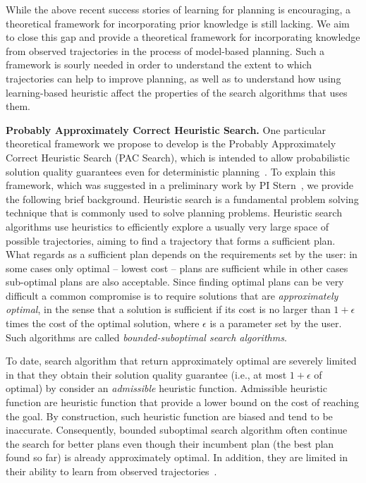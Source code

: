 \documentclass[12pt]{article}
\begin{document}
While the above recent success stories of learning for planning is encouraging, a theoretical framework for incorporating prior knowledge is still lacking. 
We aim to close this gap and provide a theoretical framework for incorporating knowledge from observed trajectories in the process of model-based planning. Such a framework is sourly needed in order to understand the extent to which trajectories can help to improve planning, as well as to understand how using learning-based heuristic affect the properties of the search algorithms that uses them. 


{\bf Probably Approximately Correct Heuristic Search.} 
One particular theoretical framework we propose to develop is the Probably Approximately Correct Heuristic Search (PAC Search), which is intended to allow probabilistic solution quality guarantees even for deterministic planning~\cite{stern2011probably,stern2012search}. 
To explain this framework, which was suggested in a preliminary work by PI Stern~\cite{stern2011probably,stern2012search}, we provide the following brief background. 
Heuristic search is a fundamental problem solving technique that is commonly used to solve planning problems. Heuristic search algorithms use heuristics to efficiently explore a usually very large space of possible trajectories, aiming to find a trajectory that forms a sufficient plan. What regards as a sufficient plan depends on the requirements set by the user: in some cases only optimal -- lowest cost -- plans are sufficient while in other cases sub-optimal plans are also acceptable. Since finding optimal plans can be very difficult a common compromise is to require solutions that are {\em approximately optimal}, in the sense that a solution is sufficient if its cost is no larger than $1+\epsilon$ times the cost of the optimal solution, where $\epsilon$ is a parameter set by the user. Such algorithms are called {\em bounded-suboptimal search algorithms}. 


To date, search algorithm that return approximately optimal are severely limited in that they obtain their solution quality guarantee (i.e., at most $1+\epsilon$ of optimal) by consider an {\em admissible} heuristic function. Admissible heuristic function are heuristic function that provide a lower bound on the cost of reaching the goal. By construction, such heuristic function are biased and tend to be inaccurate. Consequently, bounded suboptimal search algorithm often continue the search for better plans even though their incumbent plan (the best plan found so far) is already approximately optimal. In addition, they are limited in their ability to learn from observed trajectories~\cite{ees,egraphs}.
\end{document}
